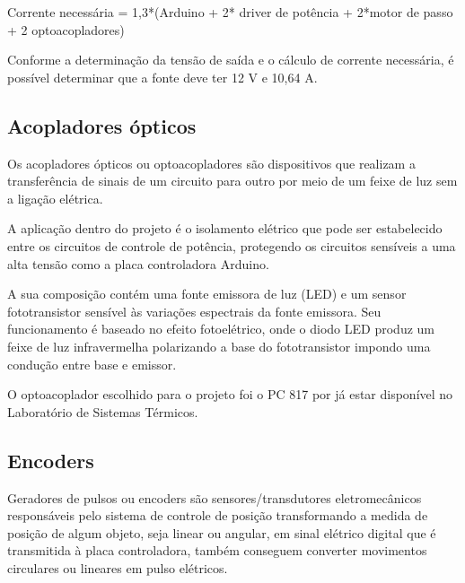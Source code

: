 Corrente necessária = 1,3*(Arduino + 2* driver de potência + 2*motor de passo + 2 optoacopladores)

Conforme a determinação da tensão de saída e o cálculo de corrente necessária, 
é possível determinar que a fonte deve ter 12 V e 10,64 A.

    
\subsection{Acopladores ópticos}\label{subsec:metacoplador}

Os acopladores ópticos ou optoacopladores são dispositivos que realizam a transferência de 
sinais de um circuito para outro por meio de um feixe de luz sem a ligação elétrica.

A aplicação dentro do projeto é o isolamento elétrico que pode ser estabelecido entre 
os circuitos de controle de potência, protegendo os circuitos sensíveis a uma alta tensão 
como a placa controladora Arduino.

    
A sua composição contém uma fonte emissora de luz (LED) e um sensor fototransistor sensível às variações 
espectrais da fonte emissora. Seu funcionamento é baseado no efeito fotoelétrico, onde o diodo LED produz 
um feixe de luz infravermelha polarizando a base do fototransistor impondo uma condução entre base e emissor.

O optoacoplador escolhido para o projeto foi o PC 817 por já estar disponível no Laboratório de Sistemas 
Térmicos.

\subsection{Encoders}\label{subsec:metencoder}

Geradores de pulsos ou encoders são sensores/transdutores eletromecânicos responsáveis pelo sistema de 
controle de posição transformando a medida de posição de algum objeto, seja linear ou angular, em sinal 
elétrico digital que é transmitida à placa controladora, também conseguem converter movimentos circulares 
ou lineares em pulso elétricos.

